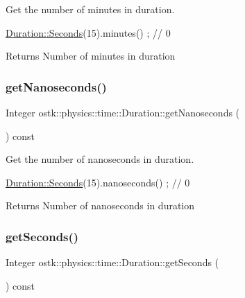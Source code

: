 Get the number of minutes in duration. 


\begin{DoxyCode}
\hyperlink{classostk_1_1physics_1_1time_1_1_duration_ad973fa34fcc308fdcc8d50c3ee694764}{Duration::Seconds}(15).minutes() ; \textcolor{comment}{// 0}
\end{DoxyCode}


\begin{DoxyReturn}{Returns}
Number of minutes in duration 
\end{DoxyReturn}
\mbox{\label{classostk_1_1physics_1_1time_1_1_duration_a6b5818c374c3535f7827f6970c563206}} 
\subsubsection{\texorpdfstring{get\+Nanoseconds()}{getNanoseconds()}}
{\footnotesize\ttfamily Integer ostk\+::physics\+::time\+::\+Duration\+::get\+Nanoseconds (\begin{DoxyParamCaption}{ }\end{DoxyParamCaption}) const}



Get the number of nanoseconds in duration. 


\begin{DoxyCode}
\hyperlink{classostk_1_1physics_1_1time_1_1_duration_ad973fa34fcc308fdcc8d50c3ee694764}{Duration::Seconds}(15).nanoseconds() ; \textcolor{comment}{// 0}
\end{DoxyCode}


\begin{DoxyReturn}{Returns}
Number of nanoseconds in duration 
\end{DoxyReturn}
\mbox{\label{classostk_1_1physics_1_1time_1_1_duration_aff2319bf58b7c3da9e87ccd88867ffe7}} 
\subsubsection{\texorpdfstring{get\+Seconds()}{getSeconds()}}
{\footnotesize\ttfamily Integer ostk\+::physics\+::time\+::\+Duration\+::get\+Seconds (\begin{DoxyParamCaption}{ }\end{DoxyParamCaption}) const}



